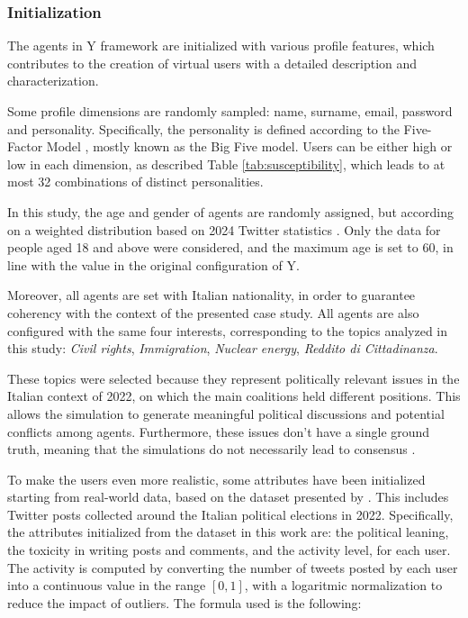 \subsubsection{Initialization}
The agents in Y framework are initialized with various profile features, which contributes to the creation of virtual users with a detailed description and characterization.

Some profile dimensions are randomly sampled: name, surname, email, password and personality.
Specifically, the personality is defined according to the Five-Factor Model \cite{barrick1991bigfive, McCrae1992}, mostly known as the Big Five model. 
Users can be either high or low in each dimension, as described Table \ref{tab:susceptibility}, which leads to at most 32 combinations of distinct personalities.

\medskip
In this study, the age and gender of agents are randomly assigned, but according on a weighted distribution based on 2024 Twitter statistics \cite{statista2024twitter}. 
Only the data for people aged 18 and above were considered, and the maximum age is set to 60, in line with the value in the original configuration of Y.

Moreover, all agents are set with Italian nationality, in order to guarantee coherency with the context of the presented case study.
All agents are also configured with the same four interests, corresponding to the topics analyzed in this study: \textit{Civil rights}, \textit{Immigration}, \textit{Nuclear energy}, \textit{Reddito di Cittadinanza}.

These topics were selected because they represent politically relevant issues in the Italian context of 2022, on which the main coalitions held different positions.
This allows the simulation to generate meaningful political discussions and potential conflicts among agents.
Furthermore, these issues don't have a single ground truth, meaning that the simulations do not necessarily lead to consensus \cite{cau2025languagedrivenopiniondynamicsagentbased}.


\medskip
To make the users even more realistic, some attributes have been initialized starting from real-world data, based on the dataset presented by \citet{pierri2023ita}. 
This includes Twitter posts collected around the Italian political elections in 2022.
Specifically, the attributes initialized from the dataset in this work are: the political leaning, the toxicity in writing posts and comments, and the activity level, for each user.
The activity is computed by converting the number of tweets posted by each user into a continuous value in the range $[0,1]$, with a logaritmic normalization to reduce the impact of outliers.
The formula used is the following:

